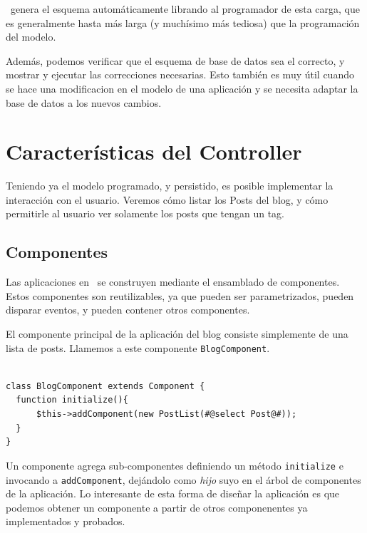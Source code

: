 \PWB \ genera el esquema automáticamente librando al programador de esta carga, que es generalmente hasta más larga (y muchísimo más tediosa) que la programación del modelo.

Además, podemos verificar que el esquema de base de datos sea el correcto, y mostrar y ejecutar las correcciones necesarias. Esto también es muy útil cuando se hace una modificacion en el modelo de una aplicación y se necesita adaptar la base de datos a los nuevos cambios.

\section{Características del Controller}
\label{sec-controller}

Teniendo ya el modelo programado, y persistido, es posible implementar la interacción con el usuario. Veremos cómo listar los Posts del blog, y cómo permitirle al usuario ver solamente los posts que tengan un tag.

\subsection{Componentes}
\label{sub-comp}

Las aplicaciones en \PWB\ se construyen mediante el ensamblado de componentes. Estos componentes son reutilizables, ya que pueden ser parametrizados, pueden disparar eventos, y pueden contener otros componentes.

El componente principal de la aplicación del blog consiste simplemente de una lista de posts. Llamemos a este componente \verb"BlogComponent".

\begin{verbatim}

class BlogComponent extends Component {
  function initialize(){
      $this->addComponent(new PostList(#@select Post@#));
  }
}
\end{verbatim}

Un componente agrega sub-componentes definiendo un método \verb"initialize" e invocando a \verb"addComponent", dejándolo como \emph{hijo} suyo en el árbol de componentes de la aplicación. Lo interesante de esta forma de diseñar la aplicación es que podemos obtener un componente a partir de otros componenentes ya implementados y probados.


